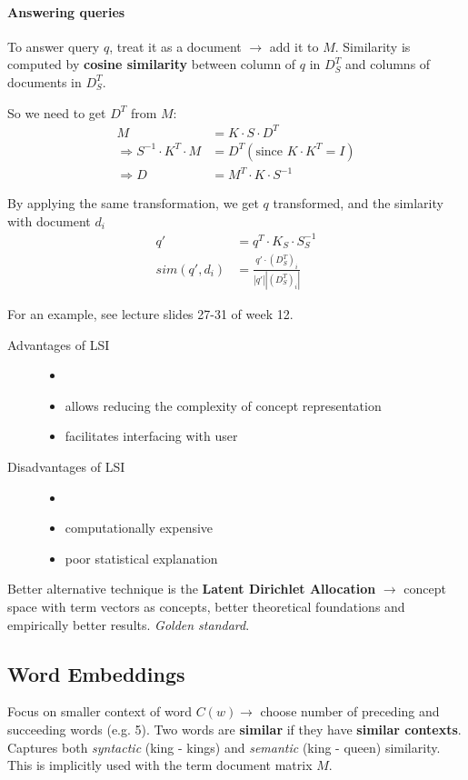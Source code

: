 \paragraph{Answering queries} To answer query $q$, treat it as a document $\longrightarrow$ add it to $M$. Similarity is computed by \textbf{cosine similarity} between column of $q$ in $D_S^T$ and columns of documents in $D_S^T$.

So we need to get $D^T$ from $M$:
\begin{align*}
  M &= K\cdot S \cdot D^T \\
  \Rightarrow S^{-1} \cdot K^T \cdot M &= D^T (\text{since } K \cdot K^T = I) \\
  \Rightarrow D &= M^T \cdot K \cdot S^{-1}
\end{align*}

By applying the same transformation, we get $q$ transformed, and the simlarity with document $d_i$
\begin{align*}
  q' &= q^T \cdot K_S \cdot S_S^{-1} \\
  sim(q', d_i) &= \frac{q' \cdot (D_S^T)_i}{|q'| |(D_S^T)_i|}
\end{align*}

For an example, see lecture slides 27-31 of week 12.

\begin{description}
  \item[Advantages of LSI]
  \begin{itemize}
    \item[]
    \item allows reducing the complexity of concept representation
    \item facilitates interfacing with user
  \end{itemize}
  \item[Disadvantages of LSI]
  \begin{itemize}
    \item[]
    \item computationally expensive
    \item poor statistical explanation
  \end{itemize}
\end{description}

Better alternative technique is the \textbf{Latent Dirichlet Allocation} $\longrightarrow$ concept space with term vectors as concepts, better theoretical foundations and empirically better results. \emph{Golden standard}.

\subsection{Word Embeddings}
Focus on smaller context of word $C(w) \rightarrow$ choose number of preceding and succeeding words (e.g. 5). Two words are \textbf{similar} if they have \textbf{similar contexts}. Captures both \emph{syntactic} (king - kings) and \emph{semantic} (king - queen) similarity. This is implicitly used with the term document matrix $M$.
